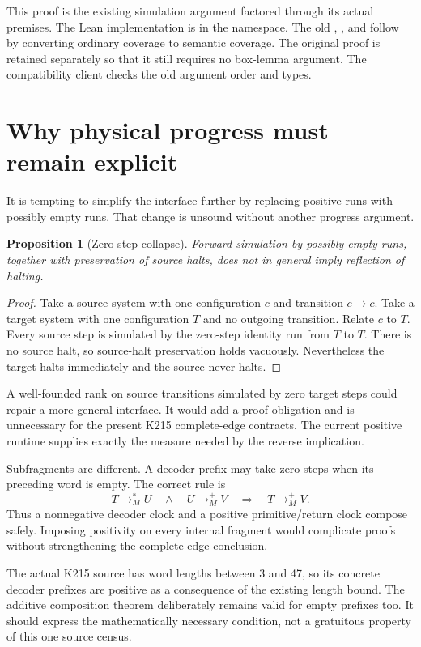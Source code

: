 \documentclass[11pt,letterpaper]{article}
\newtheorem{proposition}[theorem]{Proposition}
\theoremstyle{definition}\newtheorem{definition}[theorem]{Definition}
\theoremstyle{remark}\newtheorem{remark}[theorem]{Remark}
\newcommand{\code}[1]{\texttt{\detokenize{#1}}}
\begin{document}
This proof is the existing simulation argument factored through its actual premises. The Lean implementation is in the \code{KSim.Semantic} namespace. The old \code{sim_step}, \code{sim_halt}, and \code{halts_iff} follow by converting ordinary coverage to semantic coverage. The original \code{sim_stop} proof is retained separately so that it still requires no box-lemma argument. The compatibility client checks the old argument order and types.

\section{Why physical progress must remain explicit}

It is tempting to simplify the interface further by replacing positive runs with possibly empty runs. That change is unsound without another progress argument.

\begin{proposition}[Zero-step collapse]
Forward simulation by possibly empty runs, together with preservation of source halts, does not in general imply reflection of halting.
\end{proposition}
\begin{proof}
Take a source system with one configuration $c$ and transition $c\to c$. Take a target system with one configuration $T$ and no outgoing transition. Relate $c$ to $T$. Every source step is simulated by the zero-step identity run from $T$ to $T$. There is no source halt, so source-halt preservation holds vacuously. Nevertheless the target halts immediately and the source never halts.
\end{proof}

A well-founded rank on source transitions simulated by zero target steps could repair a more general interface. It would add a proof obligation and is unnecessary for the present K215 complete-edge contracts. The current positive runtime supplies exactly the measure needed by the reverse implication.

Subfragments are different. A decoder prefix may take zero steps when its preceding word is empty. The correct rule is
\[
T\longrightarrow_M^*U\quad\land\quad U\longrightarrow_M^+V
\quad\Longrightarrow\quad T\longrightarrow_M^+V.
\]
Thus a nonnegative decoder clock and a positive primitive/return clock compose safely. Imposing positivity on every internal fragment would complicate proofs without strengthening the complete-edge conclusion.

The actual K215 source has word lengths between 3 and 47, so its concrete decoder prefixes are positive as a consequence of the existing length bound. The additive composition theorem deliberately remains valid for empty prefixes too. It should express the mathematically necessary condition, not a gratuitous property of this one source census.
\end{document}
